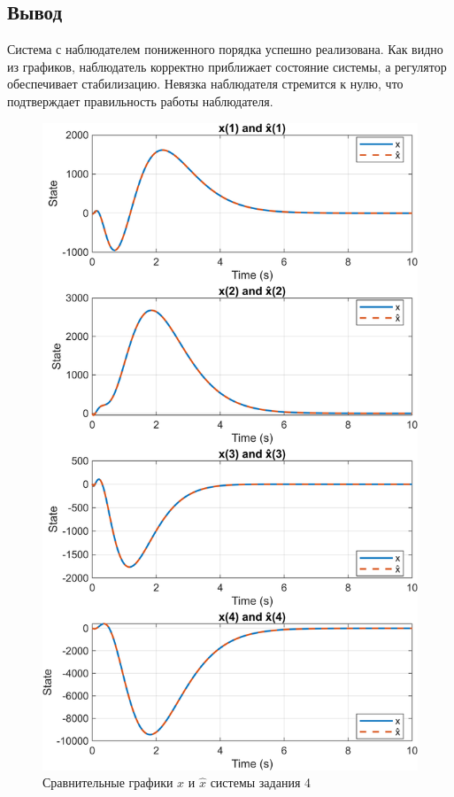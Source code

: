 \subsection{Вывод}

Система с наблюдателем пониженного порядка успешно реализована. 
Как видно из графиков, наблюдатель корректно приближает состояние 
системы, а регулятор обеспечивает стабилизацию. Невязка наблюдателя 
стремится к нулю, что подтверждает правильность работы наблюдателя.

\begin{figure}[H]
    \centering
    \includegraphics[width=0.8\linewidth]{figs/task4_1.png}
    \caption{Сравнительные графики $x$ и $\hat x$ системы задания 4}
    \label{fig:4_1}
\end{figure}


